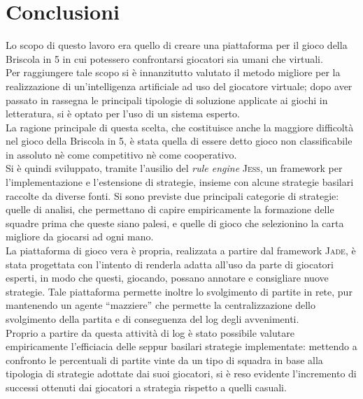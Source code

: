 \def\baselinestretch{1}
\chapter*{Conclusioni}
\graphicspath{{Chapter6/Chapter6Figs/PNG/}{Chapter6/Chapter6Figs/PDF/}{Chapter6/Chapter6Figs/}}

\def\baselinestretch{1.66}

Lo scopo di questo lavoro era quello di creare una piattaforma per il gioco della Briscola in 5 in cui potessero confrontarsi giocatori sia umani che virtuali.\\
Per raggiungere tale scopo si è innanzitutto valutato il metodo migliore per la realizzazione di un'intelligenza artificiale ad uso del giocatore virtuale; dopo aver passato in rassegna le principali tipologie di soluzione applicate ai giochi in letteratura, si è optato per l'uso di un sistema esperto.\\
La ragione principale di questa scelta, che costituisce anche la maggiore difficoltà nel gioco della Briscola in 5, è stata quella di essere detto gioco non classificabile in assoluto nè come competitivo nè come cooperativo.\\
Si è quindi sviluppato, tramite l'ausilio del \emph{rule engine} \textsc{Jess}, un framework per l'implementazione e l'estensione di strategie, insieme con alcune strategie basilari raccolte da diverse fonti. Si sono previste due principali categorie di strategie: quelle di analisi, che permettano di capire empiricamente la formazione delle squadre prima che queste siano palesi, e quelle di gioco che selezionino la carta migliore da giocarsi ad ogni mano.\\
La piattaforma di gioco vera è propria, realizzata a partire dal framework \textsc{Jade}, è stata progettata con l'intento di renderla adatta all'uso da parte di giocatori esperti, in modo che questi, giocando, possano annotare e consigliare nuove strategie.
Tale piattaforma permette inoltre lo svolgimento di partite in rete, pur mantenendo un agente ``mazziere'' che permette la centralizzazione dello svolgimento della partita e di conseguenza del log degli avvenimenti.\\
Proprio a partire da questa attività di log è stato possibile valutare empiricamente l'efficiacia delle seppur basilari strategie implementate: mettendo a confronto le percentuali di partite vinte da un tipo di squadra in base alla tipologia di strategie adottate dai suoi giocatori, si è reso evidente l'incremento di successi ottenuti dai giocatori a strategia rispetto a quelli casuali.




